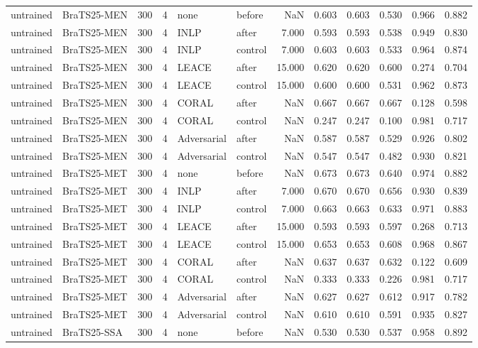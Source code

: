 \begin{tabular}{llrrllrrrrrr}
untrained & BraTS25-MEN & 300 & 4 & none & before & NaN & 0.603 & 0.603 & 0.530 & 0.966 & 0.882 \\
untrained & BraTS25-MEN & 300 & 4 & INLP & after & 7.000 & 0.593 & 0.593 & 0.538 & 0.949 & 0.830 \\
untrained & BraTS25-MEN & 300 & 4 & INLP & control & 7.000 & 0.603 & 0.603 & 0.533 & 0.964 & 0.874 \\
untrained & BraTS25-MEN & 300 & 4 & LEACE & after & 15.000 & 0.620 & 0.620 & 0.600 & 0.274 & 0.704 \\
untrained & BraTS25-MEN & 300 & 4 & LEACE & control & 15.000 & 0.600 & 0.600 & 0.531 & 0.962 & 0.873 \\
untrained & BraTS25-MEN & 300 & 4 & CORAL & after & NaN & 0.667 & 0.667 & 0.667 & 0.128 & 0.598 \\
untrained & BraTS25-MEN & 300 & 4 & CORAL & control & NaN & 0.247 & 0.247 & 0.100 & 0.981 & 0.717 \\
untrained & BraTS25-MEN & 300 & 4 & Adversarial & after & NaN & 0.587 & 0.587 & 0.529 & 0.926 & 0.802 \\
untrained & BraTS25-MEN & 300 & 4 & Adversarial & control & NaN & 0.547 & 0.547 & 0.482 & 0.930 & 0.821 \\
untrained & BraTS25-MET & 300 & 4 & none & before & NaN & 0.673 & 0.673 & 0.640 & 0.974 & 0.882 \\
untrained & BraTS25-MET & 300 & 4 & INLP & after & 7.000 & 0.670 & 0.670 & 0.656 & 0.930 & 0.839 \\
untrained & BraTS25-MET & 300 & 4 & INLP & control & 7.000 & 0.663 & 0.663 & 0.633 & 0.971 & 0.883 \\
untrained & BraTS25-MET & 300 & 4 & LEACE & after & 15.000 & 0.593 & 0.593 & 0.597 & 0.268 & 0.713 \\
untrained & BraTS25-MET & 300 & 4 & LEACE & control & 15.000 & 0.653 & 0.653 & 0.608 & 0.968 & 0.867 \\
untrained & BraTS25-MET & 300 & 4 & CORAL & after & NaN & 0.637 & 0.637 & 0.632 & 0.122 & 0.609 \\
untrained & BraTS25-MET & 300 & 4 & CORAL & control & NaN & 0.333 & 0.333 & 0.226 & 0.981 & 0.717 \\
untrained & BraTS25-MET & 300 & 4 & Adversarial & after & NaN & 0.627 & 0.627 & 0.612 & 0.917 & 0.782 \\
untrained & BraTS25-MET & 300 & 4 & Adversarial & control & NaN & 0.610 & 0.610 & 0.591 & 0.935 & 0.827 \\
untrained & BraTS25-SSA & 300 & 4 & none & before & NaN & 0.530 & 0.530 & 0.537 & 0.958 & 0.892 \\

\end{tabular}
